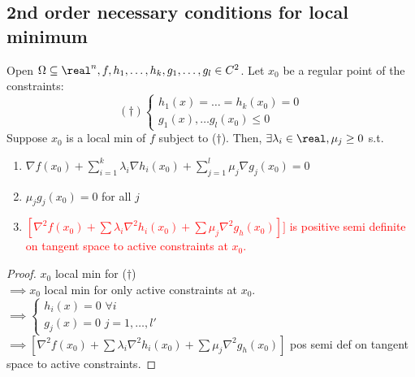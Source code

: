 \documentclass[11pt]{article}
\begin{document}
\subsection{2nd order necessary conditions for local minimum}
Open $\Omega \subseteq \real^n, f, h_1, \hdots, h_k, g_1, \hdots, g_l \in C^2$.
Let $x_0$ be a regular point of the constraints:
$$(\dagger)\begin{cases}
	h_1(x) = \hdots = h_k(x_0) = 0 \\
	g_1(x), \hdots g_l(x_0) \leq 0
\end{cases}$$
Suppose $x_0$ is a local min of $f$ subject to ($\dagger$).
Then, $\exists \lambda_i \in \real, \mu_j \geq 0$ s.t.
\begin{enumerate}
	\item $\nabla f(x_0) + \sum_{i=1}^k \lambda_i \nabla h_i(x_0) + \sum_{j=1}^l \mu_j \nabla g_j(x_0) = 0$
	\item $\mu_j g_j(x_0) = 0 $ for all $j$
	\item \textcolor{red}{$[\nabla^2 f(x_0) + \sum \lambda_i \nabla^2h_i(x_0) + \sum \mu_j \nabla^2 g_h(x_0)]]$ is positive semi definite on tangent space to active constraints at $x_0$.}
\end{enumerate}
\begin{proof}
	$x_0$ local min for ($\dag$) \\
	$\implies x_0$ local min for only active constraints at $x_0$. \\
	$\implies \begin{cases}
		h_i(x) = 0 \,\, \forall i \\
		g_j(x) = 0 \,\, j=1, \hdots, l'
	\end{cases}$ \\
	$\implies [\nabla^2 f(x_0) + \sum \lambda_i \nabla^2h_i(x_0) + \sum \mu_j \nabla^2 g_h(x_0)]$ pos semi def on tangent space to active constraints. 
\end{proof}
\end{document}
